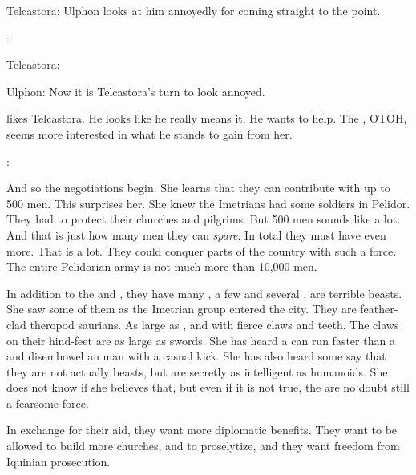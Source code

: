 Telcastora: 
Ulphon looks at him annoyedly for coming straight to the point. 

\Tiroco:

Telcastora: 

Ulphon:
Now it is Telcastora's turn to look annoyed. 

\Tiroco likes Telcastora. 
He looks like he really means it. 
He wants to help. 
The \Ispan, OTOH, seems more interested in what he stands to gain from her. 

\Tiroco:





\begin{comment}
  \section{Negotiations}
\end{comment}

And so the negotiations begin.
She learns that they can contribute with up to 500 men. 
This surprises her. 
She knew the Imetrians had some soldiers in Pelidor. 
They had to protect their churches and pilgrims. 
But 500 men sounds like a lot. 
And that is just how many men they can \emph{spare}. 
In total they must have even more. 
That is a lot. 
They could conquer parts of the country with such a force. 
The entire Pelidorian army is not much more than 10,000 men. 

In addition to the \scatha and \humans, they have many \relcs, a few \murocs and several \nycans. 
\Nycans are terrible beasts. 
She saw some of them as the Imetrian group entered the city. 
They are feather-clad theropod saurians. 
As large as \relcs, and with fierce claws and teeth. 
The claws on their hind-feet are as large as swords. 
She has heard a \nycan can run faster than a \nycan and disembowel an \armoured man with a casual kick. 
She has also heard some say that they are not actually beasts, but are secretly as intelligent as humanoids. 
She does not know if she believes that, but even if it is not true, the \nycans are no doubt still a fearsome force. 

In exchange for their aid, they want more diplomatic benefits. 
They want to be allowed to build more churches, and to proselytize, and they want freedom from Iquinian prosecution. 

